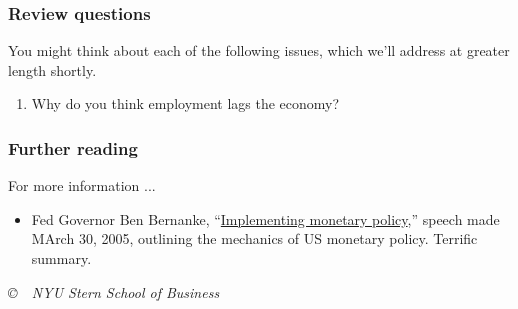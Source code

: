 \documentclass[letterpaper,12pt]{article}
\begin{document}
\subsubsection*{Review questions}

You might think about each of the following issues, which we'll
address at greater length shortly.
\begin{enumerate}

\item Why do you think employment lags the economy?

\end{enumerate}


\subsubsection*{Further reading}

For more information ...
%
\begin{itemize}
\item Fed Governor Ben Bernanke,
``\href{http://www.federalreserve.gov/BoardDocs/Speeches/2005/20050330/default.htm}{Implementing monetary policy},''
speech made MArch 30, 2005, outlining the mechanics of US monetary policy.  Terrific summary.

\end{itemize}


\vfill \centerline{\it \copyright \ \number\year \ NYU Stern
School of Business}
\end{document}
